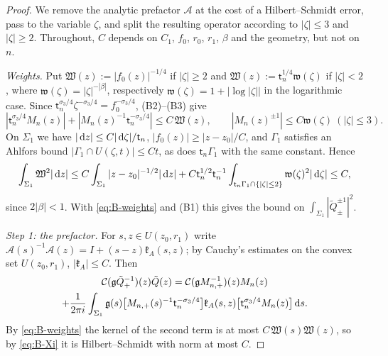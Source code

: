\begin{proof}
We remove the analytic prefactor $\mathcal A$ at the cost of a Hilbert--Schmidt error, pass to the variable $\zeta$, and split the
resulting operator according to $|\zeta|\le3$ and $|\zeta|\ge2$. Throughout, $C$ depends on $C_1$, $f_0$, $r_0$, $r_1$,
$\beta$ and the geometry, but not on $n$.

\emph{Weights.} Put $\mathfrak W(z):=|f_0(z)|^{-1/4}$ if $|\zeta|\ge2$ and $\mathfrak W(z):=\mathsf t_n^{1/4}\mathfrak w(\zeta)$ if $|\zeta|<2$, where
$\mathfrak w(\zeta)=|\zeta|^{-|\beta|}$, respectively $\mathfrak w(\zeta)=1+|\log|\zeta||$ in the logarithmic case. Since
$\mathsf t_n^{\sigma_3/4}\zeta^{-\sigma_3/4}=f_0^{-\sigma_3/4}$, (B2)--(B3) give
\begin{equation}\label{eq:B-weights}
  |\mathsf t_n^{\sigma_3/4}M_n(z)|+|M_n(z)^{-1}\mathsf t_n^{-\sigma_3/4}|\le C\,\mathfrak W(z),\qquad |M_n(z)^{\pm1}|\le C\mathfrak w(\zeta)\ (|\zeta|\le3).
\end{equation}
On $\Sigma_1$ we have $|\,\mathrm{d} z|\le C|\,\mathrm{d}\zeta|/\mathsf t_n$, $|f_0(z)|\ge|z-z_0|/C$, and $\Gamma_1$ satisfies an Ahlfors bound
$|\Gamma_1\cap U(\zeta,t)|\le Ct$, as does $\mathsf t_n\Gamma_1$ with the same constant. Hence
\begin{equation}\label{eq:B-Xi}
  \int_{\Sigma_1}\mathfrak W^2|\,\mathrm{d} z|\le C\int_{\Sigma_1}|z-z_0|^{-1/2}|\,\mathrm{d} z|+C\mathsf t_n^{1/2}\mathsf t_n^{-1}\int_{\mathsf t_n\Gamma_1\cap\{|\zeta|\le2\}}
  \mathfrak w(\zeta)^2|\,\mathrm{d}\zeta|\le C,
\end{equation}
since $2|\beta|<1$. With \eqref{eq:B-weights} and (B1) this gives the bound on $\int_{\Sigma_1}|\tilde Q_\pm^{\pm1}|^2$.

\emph{Step 1: the prefactor.} For $s,z\in U(z_0,r_1)$ write $\mathcal A(s)^{-1}\mathcal A(z)=I+(s-z)\mathfrak k_A(s,z)$; by Cauchy's
estimates on the convex set $U(z_0,r_1)$, $|\mathfrak k_A|\le C$. Then
\begin{multline*}
  \mathcal{C}(\mathfrak g\tilde Q_+^{-1})(z)\tilde Q(z)=\mathcal{C}(\mathfrak gM_{n,+}^{-1})(z)M_n(z)\\
  +\frac1{2\pi i}\int_{\Sigma_1}\mathfrak g(s)\bigl[M_{n,+}(s)^{-1}\mathsf t_n^{-\sigma_3/4}\bigr]\mathfrak k_A(s,z)
  \bigl[\mathsf t_n^{\sigma_3/4}M_n(z)\bigr]\,\mathrm{d} s .
\end{multline*}
By \eqref{eq:B-weights} the kernel of the second term is at most $C\,\mathfrak W(s)\mathfrak W(z)$, so by \eqref{eq:B-Xi} it is
Hilbert--Schmidt with norm at most $C$.


\end{proof}
